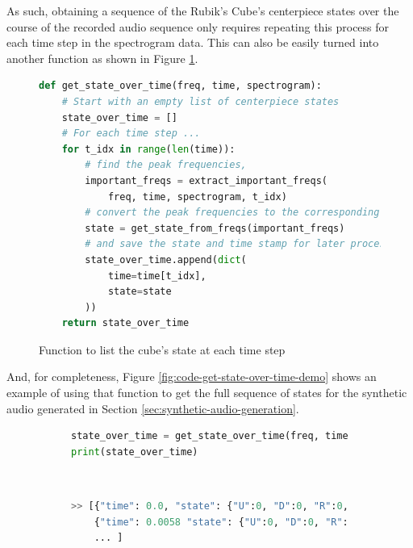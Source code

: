 As such, obtaining a sequence of the Rubik's Cube's centerpiece states over the course of the recorded audio sequence only requires repeating this process for each time step in the spectrogram data.
This can also be easily turned into another function as shown in Figure \ref{fig:code-get-state-over-time}.

\begin{figure}[h]
\caption{Function to list the cube's state at each time step}
\label{fig:code-get-state-over-time}
\begin{lstlisting}[language=Python]
def get_state_over_time(freq, time, spectrogram):
    # Start with an empty list of centerpiece states
    state_over_time = []
    # For each time step ...
    for t_idx in range(len(time)):
        # find the peak frequencies,
        important_freqs = extract_important_freqs(
            freq, time, spectrogram, t_idx)
        # convert the peak frequencies to the corresponding state,
        state = get_state_from_freqs(important_freqs)
        # and save the state and time stamp for later processing.
        state_over_time.append(dict(
            time=time[t_idx],
            state=state
        ))
    return state_over_time
\end{lstlisting}
\end{figure}

And, for completeness, Figure \ref{fig:code-get-state-over-time-demo} shows an example of using that function to get the full sequence of states for the synthetic audio generated in Section \ref{sec:synthetic-audio-generation}.
\begin{figure}[h]
\caption{Example listing of states over time}
\label{fig:code-get-state-over-time-demo} 
\begin{subfigure}{\textwidth}
\begin{lstlisting}[language=Python]
state_over_time = get_state_over_time(freq, time, spectrogram)
print(state_over_time)
\end{lstlisting}
\end{subfigure}\\

\begin{subfigure}{\textwidth}
\begin{lstlisting}[language=Python, numbers=none]
>> [{"time": 0.0, "state": {"U":0, "D":0, "R":0, "L":0, "F":0, "B":0}}, 
    {"time": 0.0058 "state": {"U":0, "D":0, "R":0, "L":0, "F":0, "B":0}},
    ... ]
\end{lstlisting}
\end{subfigure}
\end{figure}

